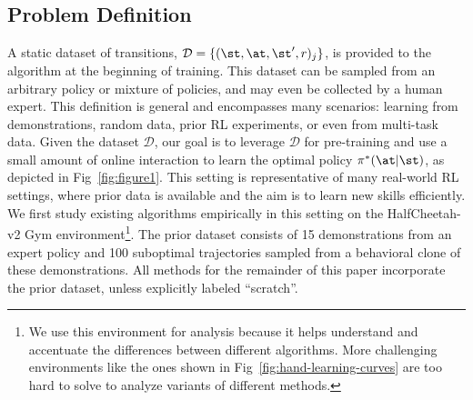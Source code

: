 \subsection{Problem Definition} \label{sec:challenges_setting}
A static dataset of transitions, \mbox{$\mathcal{D} = \{(\st, \at, \st', r)_j\}$}, is provided to the algorithm at the beginning of training. This dataset can be sampled from an arbitrary policy or mixture of policies, and may even be collected by a human expert. This definition is general and encompasses many scenarios: learning from demonstrations, random data, prior RL experiments, or even from multi-task data. Given the dataset $\mathcal{D}$, our goal is to leverage $\mathcal{D}$ for pre-training and use a small amount of online interaction to learn the optimal policy $\pi^*(\at|\st)$, as depicted in Fig~\ref{fig:figure1}. This setting is representative of many real-world RL settings, where prior data is available and the aim is to learn new skills efficiently. We first study existing algorithms empirically in this setting on the HalfCheetah-v2 Gym environment\footnote{We use this environment for analysis because it helps understand and accentuate the differences between different algorithms. More challenging environments like the ones shown in Fig~\ref{fig:hand-learning-curves}
are too hard to solve to analyze variants of different methods.}. The prior dataset consists of 15 demonstrations from an expert policy and 100 suboptimal trajectories sampled from a behavioral clone of these demonstrations. All methods for the remainder of this paper incorporate the prior dataset, unless explicitly labeled ``scratch''.



